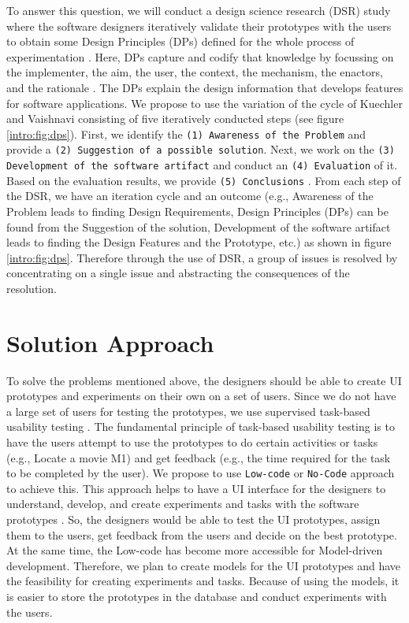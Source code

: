 To answer this question, we will conduct a design science research (DSR) study where the software designers iteratively validate their prototypes with the users to obtain some Design Principles (DPs) defined for the whole process of experimentation \cite{paper:designprinciple:vk}. 
Here, DPs capture and codify that knowledge by focussing on the implementer, the aim, the user, the context, the mechanism, the enactors, and the rationale \cite{paper:designprinciple:gregor}. 
The DPs explain the design information that develops features for software applications.
We propose to use the variation of the cycle of Kuechler and Vaishnavi \cite{paper:designprinciple:vk} consisting of five iteratively conducted steps (see figure \ref{intro:fig:dps}). 
First, we identify the 
\texttt{(1) Awareness of the Problem} and provide a
\texttt{(2) Suggestion of a possible solution}. Next, we work on the 
\texttt{(3) Development of the software artifact} and conduct an 
\texttt{(4) Evaluation} of it. Based on the evaluation results, we provide 
\texttt{(5) Conclusions} \cite{misc:crowdsourcing:sg}.
From each step of the DSR, we have an iteration cycle and an outcome (e.g., Awareness of the Problem leads to finding Design Requirements, Design Principles (DPs) can be found from the Suggestion of the solution, Development of the software artifact leads to finding the Design Features and the Prototype, etc.) as shown in figure \ref{intro:fig:dps}.
Therefore through the use of DSR, a group of issues is resolved by concentrating on a single issue and abstracting the consequences of the resolution.


\section{Solution Approach}
\label{intro:section:solution}
To solve the problems mentioned above, the designers should be able to create UI prototypes and experiments on their own on a set of users.
Since we do not have a large set of users for testing the prototypes, we use supervised task-based usability testing \cite{article:dataanalysis:supervisedtest}.
The fundamental principle of task-based usability testing is to have the users attempt to use the prototypes to do certain activities or tasks (e.g., Locate a movie M1) and get feedback (e.g., the time required for the task to be completed by the user).
We propose to use \texttt{Low-code} or \texttt{No-Code} approach to achieve this.
This approach helps to have a UI interface for the designers to understand, develop, and create experiments and tasks with the software prototypes \cite{paper:lowcode:khorram}.
So, the designers would be able to test the UI prototypes, assign them to the users, get feedback from the users and decide on the best prototype.
At the same time, the Low-code has become more accessible for Model-driven development.
Therefore, we plan to create models for the UI prototypes and have the feasibility for creating experiments and tasks. 
Because of using the models, it is easier to store the prototypes in the database and conduct experiments with the users. 

